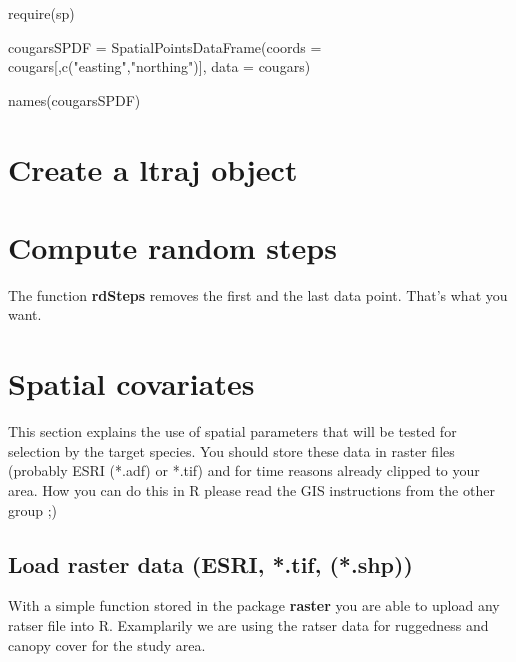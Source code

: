 \documentclass[11pt, a4paper]{article}\usepackage[]{graphicx}\usepackage[]{color}
\begin{document}
require(sp)

cougarsSPDF = SpatialPointsDataFrame(coords = cougars[,c("easting","northing")], data = cougars)

names(cougarsSPDF)




\section{Create a ltraj object}%
 

\section{Compute random steps}

The function \textbf{rdSteps} removes the first and the last data point. That's what you want. 

\section{Spatial covariates}%
This section explains the use of spatial parameters that will be tested for selection by the target species. You should store these data in raster files (probably ESRI (*.adf) or *.tif) and for time reasons already clipped to your area. How you can do this in R please read the GIS instructions from the other group ;)   

\subsection{Load raster data (ESRI, *.tif, (*.shp))}%
With a simple function stored in the package \textbf{raster} you are able to upload any ratser file into R. Examplarily we are using the ratser data for ruggedness and canopy cover for the study area.  
\end{document}
